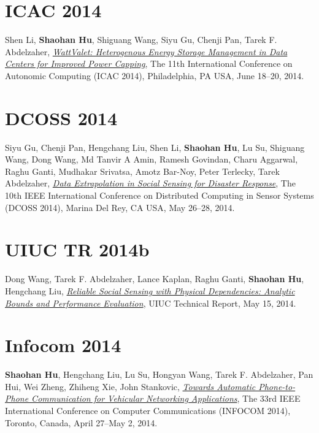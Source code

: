 \section{\sc ICAC 2014}\hypertarget{li2014icac}{} Shen Li, \textbf{Shaohan Hu}, Shiguang Wang, Siyu Gu, Chenji Pan, Tarek F. Abdelzaher, \href{https://www.usenix.org/system/files/conference/icac14/icac14-paper-li_shen.pdf}{\emph{WattValet: Heterogenous Energy Storage Management in Data Centers for Improved Power Capping}}, \textsf{The 11th International Conference on Autonomic Computing (ICAC 2014)}, Philadelphia, PA USA, June 18--20, 2014.

\section{\sc DCOSS 2014}\hypertarget{gu2014dcoss}{} Siyu Gu, Chenji Pan, Hengchang Liu, Shen Li, \textbf{Shaohan Hu}, Lu Su, Shiguang Wang, Dong Wang, Md Tanvir A Amin, Ramesh Govindan, Charu Aggarwal, Raghu Ganti, Mudhakar Srivatsa, Amotz Bar-Noy, Peter Terlecky, Tarek Abdelzaher, \href{http://ieeexplore.ieee.org/xpl/articleDetails.jsp?arnumber=6846153}{\emph{Data Extrapolation in Social Sensing for Disaster Response}}, \textsf{The 10th IEEE International Conference on Distributed Computing in Sensor Systems (DCOSS 2014)}, Marina Del Rey, CA USA, May 26--28, 2014.

\section{\sc UIUC TR 2014b}\hypertarget{wang2014uiuc}{} Dong Wang, Tarek F. Abdelzaher, Lance Kaplan, Raghu Ganti, \textbf{Shaohan Hu}, Hengchang Liu, \href{https://www.ideals.illinois.edu/handle/2142/49113}{\emph{Reliable Social Sensing with Physical Dependencies: Analytic Bounds and Performance Evaluation}}, \textsf{UIUC Technical Report}, May 15, 2014.

\section{\sc Infocom 2014}\hypertarget{hu2014infocom}{} \textbf{Shaohan Hu}, Hengchang Liu, Lu Su, Hongyan Wang, Tarek F. Abdelzaher, Pan Hui, Wei Zheng, Zhiheng Xie, John Stankovic, \href{http://ieeexplore.ieee.org/xpl/articleDetails.jsp?arnumber=6848113}{\emph{Towards Automatic Phone-to-Phone Communication for Vehicular Networking Applications}}, \textsf{The 33rd IEEE International Conference on Computer Communications (INFOCOM 2014)}, Toronto, Canada, April 27--May 2, 2014.

